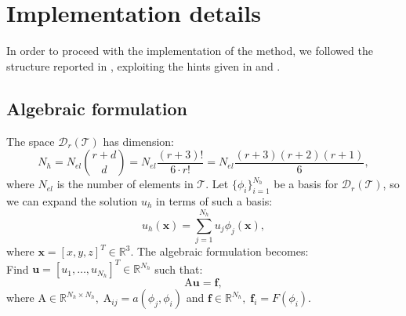 \documentclass[12pt, a4paper]{article}
\theoremstyle{definition}
\theoremstyle{plain}
\theoremstyle{plain}
\theoremstyle{definition}
\begin{document}
\section{Implementation details}\label{sec:imp}
In order to proceed with the implementation of the method, we followed the structure reported in \cite{riviere}, 
exploiting the hints given in \cite{hpmet} and \cite{hest}.
\subsection{Algebraic formulation}
The space $\mathcal{D}_r(\mathcal{T})$ has dimension:
\begin{equation*}
	N_h = N_{el} \binom{r+d}{d} = N_{el} \frac{(r+3)!}{6 \cdot r!} = N_{el} \frac{(r+3)(r+2)(r+1)}{6},
\end{equation*}
where $N_{el}$ is the number of elements in $\mathcal{T}$. Let $\{ \phi_i 
\}^{N_h}_{i=1}$ be a basis for $\mathcal{D}_r(\mathcal{T})$, so we can expand 
the solution $u_h$ in terms of such a basis:
\begin{equation*}
	u_h(\mathbf{x}) = \sum_{j = 1}^{N_h} u_j \phi_j(\mathbf{x}),
\end{equation*}
where $\mathbf{x}=[x, y, z]^T \in \mathbb{R}^3$. The algebraic formulation 
becomes:\\
Find $\mathbf{u} = [u_1, \dots, u_{N_h}]^T \in \mathbb{R}^{N_h} $ such that:
\begin{equation*}
	\mathrm{A}\mathbf{u} = \mathbf{f},
\end{equation*}
where $\mathrm{A} \in \mathbb{R}^{N_h \times N_h}, \; \mathrm{A}_{ij} = a(\phi_j, \phi_i)$ and $\mathbf{f} \in \mathbb{R}^{N_h}, \; \mathbf{f}_i = F(\phi_i)$.
\end{document}
